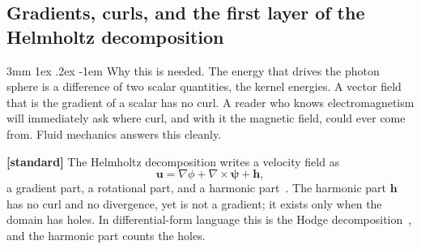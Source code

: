 \documentclass[%
 reprint, amsmath,amssymb, aps, prb, ]{revtex4-2}
\makeatletter
\numberwithin{equation}{section}
\renewcommand\paragraph{%
  \@startsection{paragraph}{4}{\z@}%
    {3mm \@plus 1ex \@minus .2ex}
    {-1em}
    {\normalfont\normalsize\itshape}}
\makeatother
\begin{document}
\subsection{Gradients, curls, and the first layer of the Helmholtz decomposition}

\paragraph{Why this is needed.} The energy that drives the photon sphere is a difference of two scalar quantities, the kernel energies. A vector field that is the gradient of a scalar has no curl. A reader who knows electromagnetism will immediately ask where curl, and with it the magnetic field, could ever come from. Fluid mechanics answers this cleanly.

\textbf{[standard]} The Helmholtz decomposition writes a velocity field as
\begin{equation}
\mathbf{u} = \nabla\phi + \nabla\times\bm{\psi} + \mathbf{h},
\label{eq:helmholtz}
\end{equation}
a gradient part, a rotational part, and a harmonic part~\cite{ref:helmholtz,ref:bhatia}. The harmonic part $\mathbf{h}$ has no curl and no divergence, yet is not a gradient; it exists only when the domain has holes. In differential-form language this is the Hodge decomposition~\cite{ref:hodge}, and the harmonic part counts the holes.
\end{document}
